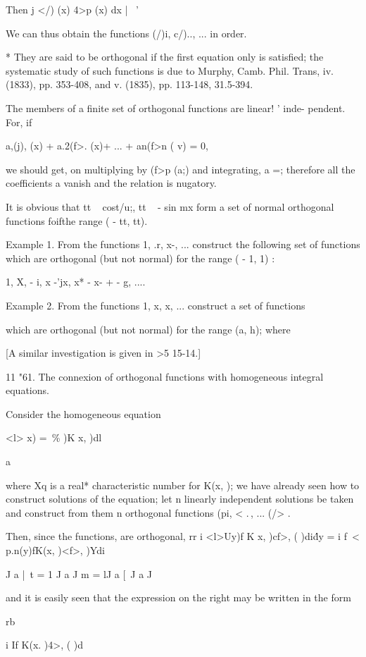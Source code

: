 {Then j </) (x) 4>p (x) dx |~ '

We can thus obtain the functions (/)i, c/).., ... in order.

* They are said to be orthogonal if the first equation only is
satisfied; the systematic study of such functions is due to Murphy,
Camb. Phil. Trans, iv. (1833), pp. 353-408, and v. (1835), pp.
113-148, 31.5-394.

%
%

The members of a finite set of orthogonal functions are linear! '
inde- pendent. For, if

a,(j), (x) + a.2(f>. (x)+ ... + an(f>n ( v) = 0,

we should get, on multiplying by (f>p (a;) and integrating, a =;
therefore all the coefficients a vanish and the relation is nugatory.

It is obvious that tt ~ cost/u;, tt ~ - sin mx form a set of normal
orthogonal functions foifthe range ( - tt, tt).

Example 1. From the functions 1, .r, x-, ... construct the following
set of functions which are orthogonal (but not normal) for the range (
- 1, 1) :

1, X, - i, x -'jx, x* - x- + - g, ....

Example 2. From the functions 1, x, x, ... construct a set of
functions

which are orthogonal (but not normal) for the range (a, h); where

[A similar investigation is given in >5 15-14.]

11 "61. The connexion of orthogonal functions with homogeneous
integral equations.

Consider the homogeneous equation

<l> x) = \,\% )K x, )dl

  a

where Xq is a real* characteristic number for K(x, ); we have already
seen how to construct solutions of the equation; let n linearly
independent solutions be taken and construct from them n orthogonal
functions (pi, < .\,, ... (/> .

Then, since the functions, are orthogonal, rr i <l>Uy)f K x, )cf>, (
)di\'dy = i f\ < p.n(y)fK(x, )<f>, )Ydi

J a |\ t = 1 J a J m = lJ a [\ J a J

and it is easily seen that the expression on the right may be written
in the form

rb

i If K(x. )4>, ( )d

}
